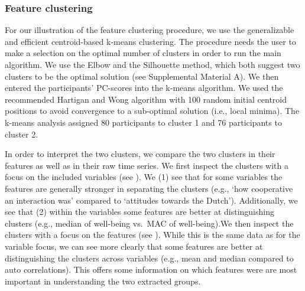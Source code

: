 \subsubsection{Feature clustering}

For our illustration of the feature clustering procedure, we use the
generalizable and efficient centroid-based k-means clustering. The
procedure needs the user to make a selection on the optimal number of
clusters in order to run the main algorithm. We use the Elbow and the
Silhouette method, which both suggest two clusters to be the optimal
solution (see Supplemental Material A). We then entered the
participants' PC-scores into the k-means algorithm. We used the
recommended Hartigan and Wong algorithm \citep{hartigan1979} with 100
random initial centroid positions to avoid convergence to a sub-optimal
solution (i.e., local minima). The k-means analysis assigned 80
participants to cluster 1 and 76 participants to cluster 2.

In order to interpret the two clusters, we compare the two clusters in
their features as well as in their raw time series. We first inspect the
clusters with a focus on the included variables (see
). We (1) see that for some variables the
features are generally stronger in separating the clusters (e.g., `how
cooperative an interaction was' compared to `attitudes towards the
Dutch'). Additionally, we see that (2) within the variables some
features are better at distinguishing clusters (e.g., median of
well-being vs.~MAC of well-being).We then inspect the clusters with a
focus on the features (see ). While this
is the same data as for the variable focus, we can see more clearly that
some features are better at distinguishing the clusters across variables
(e.g., mean and median compared to auto correlations). This offers some
information on which features were are most important in understanding
the two extracted groups.

